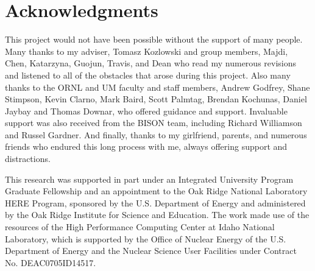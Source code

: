 \documentclass[edeposit,fullpage,11pt]{uiucthesis2009}
\begin{document}

\chapter*{Acknowledgments}

This project would not have been possible without the support of many people. 
Many thanks to my adviser, Tomasz Kozlowski and group members, Majdi, Chen, Katarzyna, Guojun, Travis, and Dean who read my numerous revisions and listened to all of the obstacles that arose during this project.
Also many thanks to the ORNL and UM faculty and staff members, Andrew Godfrey, Shane Stimpson, Kevin Clarno, Mark Baird, Scott Palmtag, Brendan Kochunas, Daniel Jaybay and Thomas Downar, who offered guidance and support.
Invaluable support was also received from the BISON team, including Richard Williamson and Russel Gardner.
And finally, thanks to my girlfriend, parents, and numerous friends who endured this long process with me, always offering support and distractions.

This research was supported in part under an Integrated University Program Graduate Fellowship and an appointment to the Oak Ridge National Laboratory HERE Program, sponsored by the U.S. Department of Energy and administered by the Oak Ridge Institute for Science and Education.
The work made use of the resources of the High Performance Computing Center at Idaho National Laboratory, which is supported by the Office of Nuclear Energy of the U.S. Department of Energy and the Nuclear Science User Facilities under Contract No. DE­AC07­05ID14517.

\end{document}
